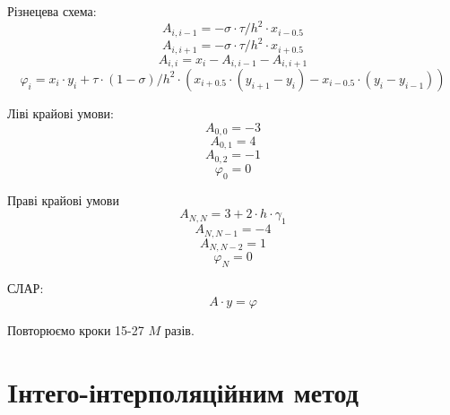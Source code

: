 \documentclass[fontsize=14pt,DIV=1,a4paper]{scrartcl}
\begin{document}
	Різнецева схема:
	\begin{equation}
		A_{i,i-1} = -\sigma \cdot \tau / h^2 \cdot x_{i-0.5}
	\end{equation}
	\begin{equation}
		A_{i,i+1} = -\sigma \cdot \tau / h^2 \cdot x_{i+0.5}
	\end{equation}
	\begin{equation}
		A_{i,i} = x_i - A_{i,i-1} - A_{i,i+1}
	\end{equation}
	\begin{equation}
		\varphi_i = x_i \cdot y_i + \tau \cdot (1-\sigma)/h^2 \cdot (x_{i+0.5} \cdot (y_{i+1}-y_i)-x_{i-0.5} \cdot (y_i-y_{i-1}))
	\end{equation}
	
	Ліві крайові умови:
	\begin{equation}
		A_{0,0}=-3
	\end{equation}
	\begin{equation}
		A_{0,1}=4
	\end{equation}
	\begin{equation}
		A_{0,2}=-1
	\end{equation}
	\begin{equation}
		\varphi_{0}=0
	\end{equation}
	
	Праві крайові умови
	\begin{equation}
		A_{N, N}=3+2 \cdot h\cdot \gamma_1
	\end{equation}
	\begin{equation}
		A_{N, N-1}=-4
	\end{equation}
	\begin{equation}
		A_{N, N-2}=1
	\end{equation}
	\begin{equation}
		\varphi_{N}=0
	\end{equation}
	
	СЛАР:
	\begin{equation}
		A \cdot y = \varphi
	\end{equation}
	
	Повторюємо кроки 15-27 $M$ разів.
	
	\newpage
	\section{Iнтего-інтерполяційним метод}
\end{document}
